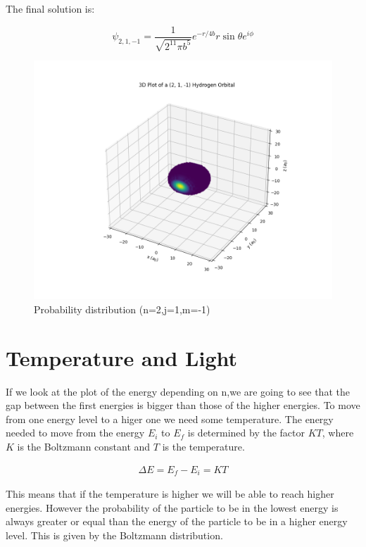The final solution is:

\begin{equation}
  \psi_{2,1,-1} = \frac{1}{\sqrt{2^{11}\pi b^5}} e^{-r/4b} r \sin\theta e^{i\phi}
\end{equation}


\begin{figure}
  \centering
  \includegraphics{images9/3d_plot_2,1,-1.png}
  \caption{Probability distribution (n=2,j=1,m=-1)}
\end{figure}


\section{Temperature and Light}

If we look at the plot of  the energy depending on n,we are going to see that the gap between the first energies is bigger than those of the higher energies. To move from one energy level to a higer one we need some temperature. The energy needed to move from the energy $E_i$ to $E_f$ is determined by the factor $KT$, where $K$ is the Boltzmann constant and $T$ is the temperature.

\begin{equation}
  \begin{array}{c}
    \Delta E = E_f - E_i = KT
  \end{array}
\end{equation}

This means that if the temperature is higher we will be able to reach higher energies. However the probability of the particle to be in the lowest energy is always greater or equal than the energy of the particle to be in a higher energy level. This is given by the Boltzmann distribution.

